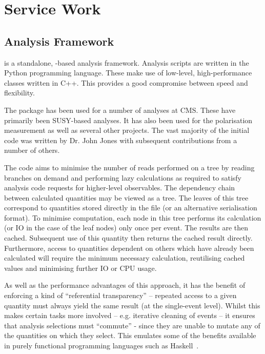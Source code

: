 \chapter{Service Work}
\label{sec:service_work}
\section{ Analysis Framework}
 is a standalone, \root-based analysis framework. Analysis
scripts are written in the Python programming language. These make use of
low-level, high-performance classes written in C++. This provides a good
compromise between speed and flexibility.

The  package has been used for a number of analyses at
\ac{CMS}. These have primarily been \ac{SUSY}-based analyses. It has also been
used for the \PW polarisation measurement as well as several other projects. The
vast majority of the initial code was written by Dr. John Jones with subsequent
contributions from a number of others.

The  code aims to minimise the number of reads performed on a \root tree
by reading branches on demand and performing lazy calculations as required to
satisfy analysis code requests for higher-level observables. The dependency
chain between calculated quantities may be viewed as a tree. The leaves of this
tree correspond to quantities stored directly in the \root file (or an
alternative serialisation format). To minimise computation, each node in this
tree performs its calculation (or \ac{IO} in the case of the leaf nodes) only
once per event. The results are then cached. Subsequent use of this quantity
then returns the cached result directly. Furthermore, access to quantities
dependent on others which have already been calculated will require the minimum
necessary calculation, reutilising cached values and minimising further \ac{IO}
or CPU usage.

As well as the performance advantages of this approach, it has the benefit of
enforcing a kind of ``referential transparency'' -- repeated access to a given
quantity must always yield the same result (at the single-event level). Whilst
this makes certain tasks more involved -- e.g. iterative cleaning of events --
it ensures that analysis selections must ``commute'' - since they are unable to
mutate any of the quantities on which they select. This emulates some of the
benefits available in purely functional programming languages such as
Haskell~\cite{history_of_haskell}.

